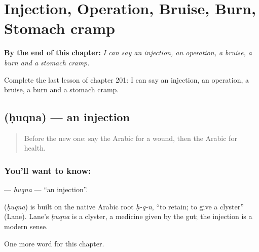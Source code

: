 
\chapter{Injection, Operation, Bruise, Burn, Stomach cramp}
\label{ch:ar-injection-operation-bruise-burn-stomach-cramp}

\begin{chapteropening}
\textbf{By the end of this chapter:} \emph{I can say an injection, an operation, a bruise, a burn and a stomach cramp.}

Complete the last lesson of chapter 201: I can say an injection, an operation, a bruise, a burn and a stomach cramp.
\end{chapteropening}

\section[\texorpdfstring{\ar{حقنة} (ḥuqna)}{حقنة (ḥuqna)}]{ (ḥuqna) — an injection}

\label{lesson:AR-C201-huqna}



\begin{quote}
Before the new one: say the Arabic for a wound, then the Arabic for health.
\end{quote}

\subsection*{You'll want to know: }
\textbf{} — \emph{ḥuqna} — \textquotedblleft{}an injection\textquotedblright{}.

\begin{cousinweb}
\textbf{} (\emph{ḥuqna}) is built on the native Arabic root \emph{ḥ-q-n}, \textquotedblleft{}to retain; to give a clyster\textquotedblright{} (Lane). Lane's \emph{ḥuqna} is a clyster, a medicine given by the gut; the injection is a modern sense.
\end{cousinweb}

\begin{grammarlens}[title={What you've built}]
One more word for this chapter.
\end{grammarlens}

